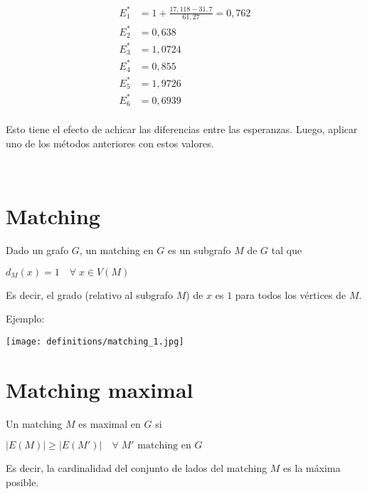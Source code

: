 \documentclass[10pt,a4paper]{article}
\begin{document}
\begin{center}
\begin{align*} E^*_1 &= 1 +\frac{ 17, 118 - 31,7}{61,27} = 0,762\\ E^*_2 &= 0,638\\ E^*_3 &= 1,0724\\ E^*_4 &= 0,855\\ E^*_5 &= 1,9726\\ E^*_6 &= 0,6939\\ \end{align*}
\end{center}

Esto tiene el efecto de achicar las diferencias entre las esperanzas. Luego, aplicar uno de los métodos anteriores con estos valores.

 

\section*{Matching}

Dado un grafo $G$, un matching en $G$ es un subgrafo $M$ de $G$ tal que

\begin{center}
$d_M(x) = 1\quad \forall\;x \in V(M)$
\end{center}

Es decir, el grado (relativo al subgrafo $M$) de $x$ es $1$ para todos los vértices de $M$.

Ejemplo:

\begin{center}

    \begin{adjustbox}{max size={\textwidth}{\textheight}}
        \texttt{[image: definitions/matching\_1.jpg]}
        \end{adjustbox}
    
\end{center}

\section*{Matching maximal}

Un matching $M$ es maximal en $G$ si

\begin{center}
$\lvert E(M)\rvert \geq \lvert E(M')\rvert\quad \forall\; M'\text{ matching en } G$
\end{center}

Es decir, la cardinalidad del conjunto de lados del matching $M$ es la máxima posible.
\end{document}
